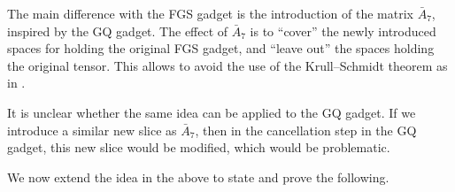 \begin{remark}\label{rem:hybrid}
The main difference with the FGS gadget is the introduction of the matrix $\bar A_7$, inspired by the GQ gadget. The effect of $\bar A_7$ is to ``cover'' the newly introduced spaces for holding the original FGS gadget, and ``leave out'' the spaces holding the original tensor. This allows to avoid the use of the Krull--Schmidt theorem as in \cite{FGS19}. 

It is unclear whether the same idea can be applied to the GQ gadget. If we introduce a similar new slice as $\bar A_7$, then in the cancellation step in the GQ gadget, this new slice would be modified, which would be problematic.
\end{remark}

We now extend the idea in the above to state and prove the following.

